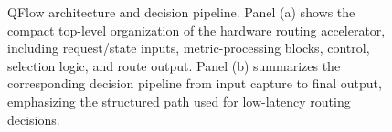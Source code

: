 \begin{figure}[t]
    \centering
    \resizebox{\textwidth}{!}{}
    \caption{QFlow architecture and decision pipeline. Panel (a) shows the compact top-level organization of the hardware routing accelerator, including request/state inputs, metric-processing blocks, control, selection logic, and route output. Panel (b) summarizes the corresponding decision pipeline from input capture to final output, emphasizing the structured path used for low-latency routing decisions.}
    \label{fig:qflow_architecture}
\end{figure}
